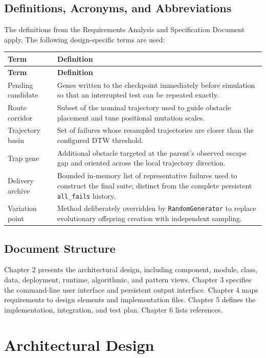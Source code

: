 \documentclass[11pt,a4paper]{report}
\newcommand{\code}[1]{\texttt{#1}}
\begin{document}
\section{Definitions, Acronyms, and Abbreviations}
The definitions from the Requirements Analysis and Specification Document apply. The following design-specific terms are used:
\begin{longtable}{L{3.4cm} L{11.4cm}}
\toprule
\textbf{Term} & \textbf{Definition}\\
\midrule
\endfirsthead
\toprule
\textbf{Term} & \textbf{Definition}\\
\midrule
\endhead
Pending candidate & Genes written to the checkpoint immediately before simulation so that an interrupted test can be repeated exactly.\\
Route corridor & Subset of the nominal trajectory used to guide obstacle placement and tune positional mutation scales.\\
Trajectory basin & Set of failures whose resampled trajectories are closer than the configured DTW threshold.\\
Trap gene & Additional obstacle targeted at the parent's observed escape gap and oriented across the local trajectory direction.\\
Delivery archive & Bounded in-memory list of representative failures used to construct the final suite; distinct from the complete persistent \texttt{all\_fails} history.\\
Variation point & Method deliberately overridden by \code{RandomGenerator} to replace evolutionary offspring creation with independent sampling.\\
\bottomrule
\end{longtable}

\section{Document Structure}
Chapter 2 presents the architectural design, including component, module, class, data, deployment, runtime, algorithmic, and pattern views. Chapter 3 specifies the command-line user interface and persistent output interface. Chapter 4 maps requirements to design elements and implementation files. Chapter 5 defines the implementation, integration, and test plan. Chapter 6 lists references.

\chapter{Architectural Design}
\end{document}

